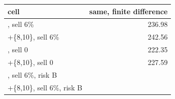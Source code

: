 \begin{tabular}{lr}
\toprule
cell & same, finite difference \\
\midrule
[0,6], sell 6\% & 236.98 \\
[0,6]+\{8,10\}, sell 6\% & 242.56 \\
[0,6], sell 0 & 222.35 \\
[0,6]+\{8,10\}, sell 0 & 227.59 \\
[0,6], sell 6\%, risk B &  \\
[0,6]+\{8,10\}, sell 6\%, risk B &  \\
\bottomrule
\end{tabular}
